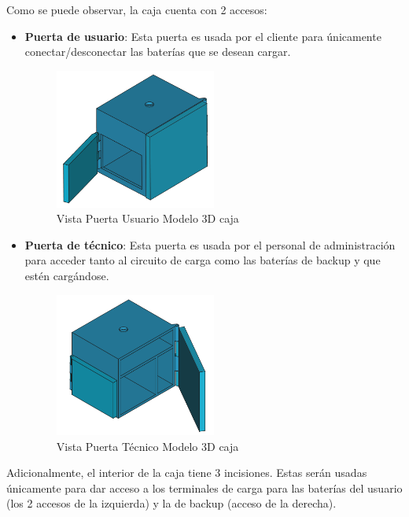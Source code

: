 Como se puede observar, la caja cuenta con 2 accesos:
\begin{itemize}
    \item \textbf{Puerta de usuario}: Esta puerta es usada por el cliente para únicamente conectar/desconectar las baterías que se desean cargar.

\begin{figure}[H]
    \centering
    \includegraphics[width=0.5\textwidth]{images/4-DesarrolloTeorico/4-1-caja/CAJA_3D_PUERTA_USER.png}
    \caption{Vista Puerta Usuario Modelo 3D caja}
    \label{fig:DesarrolloTeorico/Caja/CAJA_3D_PUERTA_USER}
\end{figure}

    \item \textbf{Puerta de técnico}: Esta puerta es usada por el personal de administración para acceder tanto al circuito de carga como las baterías de backup y que estén cargándose.
\begin{figure}[H]
    \centering
    \includegraphics[width=0.5\textwidth]{images/4-DesarrolloTeorico/4-1-caja/CAJA_3D_PUERTA_ADMIN.png}
    \caption{Vista Puerta Técnico Modelo 3D caja}
    \label{fig:DesarrolloTeorico/Caja/CAJA_3D_PUERTA_ADMIN}
\end{figure}

\end{itemize}

Adicionalmente, el interior de la caja tiene 3 incisiones. Estas serán usadas únicamente para dar acceso a los terminales de carga para las baterías del usuario (los 2 accesos de la izquierda) y la de backup (acceso de la derecha).

